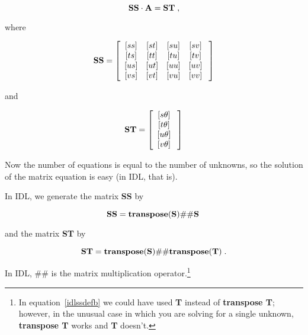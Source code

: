 \begin{equation}
{\bf SS \cdot A} = {\bf ST} \; ,
\end{equation}

\noindent where

\begin{mathletters} 
\label{ssdef}
\begin{eqnarray} 
{\bf SS} = \left[
\begin{array}{cccc} 
{[ss]} & {[st]} & {[su]} & {[sv]} \\ 
{[ts]} & {[tt]} & {[tu]} & {[tv]} \\ 
{[us]} & {[ut]} & {[uu]} & {[uv]} \\ 
{[vs]} & {[vt]} & {[vu]} & {[vv]} \\
\end{array} 
\; \right] 
\end{eqnarray} 

\noindent and

\begin{eqnarray} 
{\bf ST} = \left[
\begin{array}{c} 
{[s \theta]} \\ 
{[t \theta]} \\ 
{[u \theta]} \\ 
{[v \theta]} \\ 
\end{array} 
\; \right]
\end{eqnarray} 
\end{mathletters} 

\noindent Now the number of equations is equal to the number of
unknowns, so the solution of the matrix equation is easy (in IDL, that
is). 

	In IDL, we generate the matrix {\bf SS} by

\begin{mathletters}
\label{idlssdef}
\begin{equation}
{\bf SS} = {\bf transpose(S) \# \# S} \; 
\end{equation}

\noindent and the matrix {\bf ST} by

\begin{equation}
\label{idlssdefb}
{\bf ST} = {\bf transpose(S) \# \# transpose(T)} \; .
\end{equation}
\end{mathletters}

\noindent In IDL, $\#\#$ is the matrix multiplication
operator.\footnote{In equation~\ref{idlssdefb} we could have used {\bf
T} instead of {\bf transpose T}; however, in the unusual case in which
you are solving for a single unknown, {\bf transpose T} works and {\bf
T} doesn't.}

